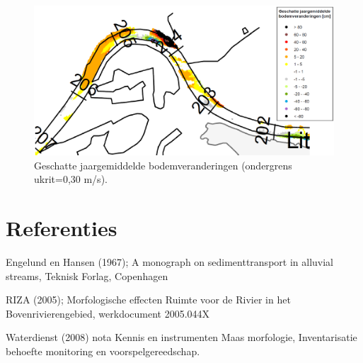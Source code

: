\begin{figure}
\includegraphics[width=\columnwidth]{figures/Fig14c.png}
\caption{Geschatte jaargemiddelde bodemveranderingen (ondergrens ukrit=0,30 m/s).}
\label{Fig14c}
\end{figure}

\chapter*{Referenties}

Engelund en Hansen (1967); A monograph on sedimenttransport in alluvial streams, Teknisk Forlag, Copenhagen

RIZA (2005); Morfologische effecten Ruimte voor de Rivier in het Bovenrivierengebied, werkdocument 2005.044X

Waterdienst (2008) nota Kennis en instrumenten Maas morfologie, Inventarisatie behoefte monitoring en voorspelgereedschap.